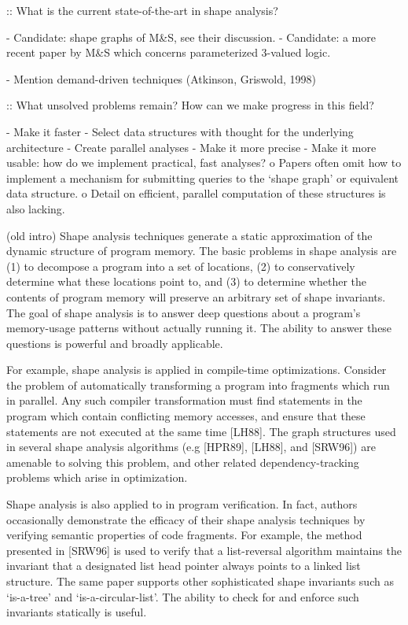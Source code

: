 \documentclass{article}
\begin{document}
:: What is the current state-of-the-art in shape analysis?

- Candidate: shape graphs of M\&S, see their discussion.
- Candidate: a more recent paper by M\&S which concerns parameterized 3-valued
  logic.

- Mention demand-driven techniques (Atkinson, Griswold, 1998)

:: What unsolved problems remain? How can we make progress in this field?

- Make it faster
    - Select data structures with thought for the underlying architecture
    - Create parallel analyses
- Make it more precise
- Make it more usable: how do we implement practical, fast analyses?
	o Papers often omit how to implement a mechanism for submitting queries
	  to the `shape graph' or equivalent data structure.  
	o Detail on efficient, parallel computation of these structures is also
	  lacking.

      (old intro)
Shape analysis techniques generate a static approximation of the dynamic
structure of program memory. The basic problems in shape analysis are (1) to
decompose a program into a set of locations, (2) to conservatively determine
what these locations point to, and (3) to determine whether the contents of
program memory will preserve an arbitrary set of shape invariants. The goal
of shape analysis is to answer deep questions about a program's memory-usage
patterns without actually running it. The ability to answer these questions
is powerful and broadly applicable.

For example, shape analysis is applied in compile-time optimizations.
Consider the problem of automatically transforming a program into fragments
which run in parallel. Any such compiler transformation must find
statements in the program which contain conflicting memory accesses, and
ensure that these statements are not executed at the same time [LH88]. The
graph structures used in several shape analysis algorithms (e.g [HPR89],
[LH88], and [SRW96]) are amenable to solving this problem, and other related
dependency-tracking problems which arise in optimization.

Shape analysis is also applied to in program verification. In fact, authors
occasionally demonstrate the efficacy of their shape analysis techniques by
verifying semantic properties of code fragments. For example, the method
presented in [SRW96] is used to verify that a list-reversal algorithm
maintains the invariant that a designated list head pointer always points to
a linked list structure. The same paper supports other sophisticated shape
invariants such as `is-a-tree' and `is-a-circular-list'. The ability to
check for and enforce such invariants statically is useful.
\end{document}
